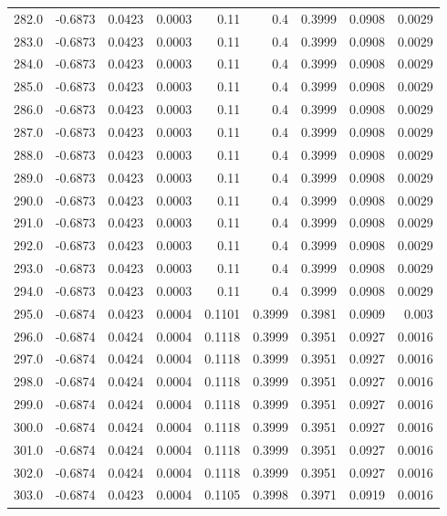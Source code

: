 \begin{longtable}{lrrrrrrrr}
282.0 & -0.6873 & 0.0423 & 0.0003 & 0.11 & 0.4 & 0.3999 & 0.0908 & 0.0029 \\
283.0 & -0.6873 & 0.0423 & 0.0003 & 0.11 & 0.4 & 0.3999 & 0.0908 & 0.0029 \\
284.0 & -0.6873 & 0.0423 & 0.0003 & 0.11 & 0.4 & 0.3999 & 0.0908 & 0.0029 \\
285.0 & -0.6873 & 0.0423 & 0.0003 & 0.11 & 0.4 & 0.3999 & 0.0908 & 0.0029 \\
286.0 & -0.6873 & 0.0423 & 0.0003 & 0.11 & 0.4 & 0.3999 & 0.0908 & 0.0029 \\
287.0 & -0.6873 & 0.0423 & 0.0003 & 0.11 & 0.4 & 0.3999 & 0.0908 & 0.0029 \\
288.0 & -0.6873 & 0.0423 & 0.0003 & 0.11 & 0.4 & 0.3999 & 0.0908 & 0.0029 \\
289.0 & -0.6873 & 0.0423 & 0.0003 & 0.11 & 0.4 & 0.3999 & 0.0908 & 0.0029 \\
290.0 & -0.6873 & 0.0423 & 0.0003 & 0.11 & 0.4 & 0.3999 & 0.0908 & 0.0029 \\
291.0 & -0.6873 & 0.0423 & 0.0003 & 0.11 & 0.4 & 0.3999 & 0.0908 & 0.0029 \\
292.0 & -0.6873 & 0.0423 & 0.0003 & 0.11 & 0.4 & 0.3999 & 0.0908 & 0.0029 \\
293.0 & -0.6873 & 0.0423 & 0.0003 & 0.11 & 0.4 & 0.3999 & 0.0908 & 0.0029 \\
294.0 & -0.6873 & 0.0423 & 0.0003 & 0.11 & 0.4 & 0.3999 & 0.0908 & 0.0029 \\
295.0 & -0.6874 & 0.0423 & 0.0004 & 0.1101 & 0.3999 & 0.3981 & 0.0909 & 0.003 \\
296.0 & -0.6874 & 0.0424 & 0.0004 & 0.1118 & 0.3999 & 0.3951 & 0.0927 & 0.0016 \\
297.0 & -0.6874 & 0.0424 & 0.0004 & 0.1118 & 0.3999 & 0.3951 & 0.0927 & 0.0016 \\
298.0 & -0.6874 & 0.0424 & 0.0004 & 0.1118 & 0.3999 & 0.3951 & 0.0927 & 0.0016 \\
299.0 & -0.6874 & 0.0424 & 0.0004 & 0.1118 & 0.3999 & 0.3951 & 0.0927 & 0.0016 \\
300.0 & -0.6874 & 0.0424 & 0.0004 & 0.1118 & 0.3999 & 0.3951 & 0.0927 & 0.0016 \\
301.0 & -0.6874 & 0.0424 & 0.0004 & 0.1118 & 0.3999 & 0.3951 & 0.0927 & 0.0016 \\
302.0 & -0.6874 & 0.0424 & 0.0004 & 0.1118 & 0.3999 & 0.3951 & 0.0927 & 0.0016 \\
303.0 & -0.6874 & 0.0423 & 0.0004 & 0.1105 & 0.3998 & 0.3971 & 0.0919 & 0.0016 \\

\end{longtable}
